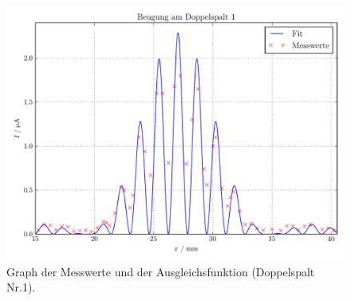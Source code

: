 \documentclass[
  bibliography=totoc,     %
  captions=tableheading,  %
  titlepage=firstiscover, %
]{scrartcl}
\begin{document}
\clearpage
\begin{figure}
  \centering
  \includegraphics[width=\textwidth]{Plot2.pdf}
  \caption{Graph der Messwerte und der Ausgleichsfunktion (Doppelspalt Nr.1).}
  \label{fig:plot2}
\end{figure}
\end{document}
